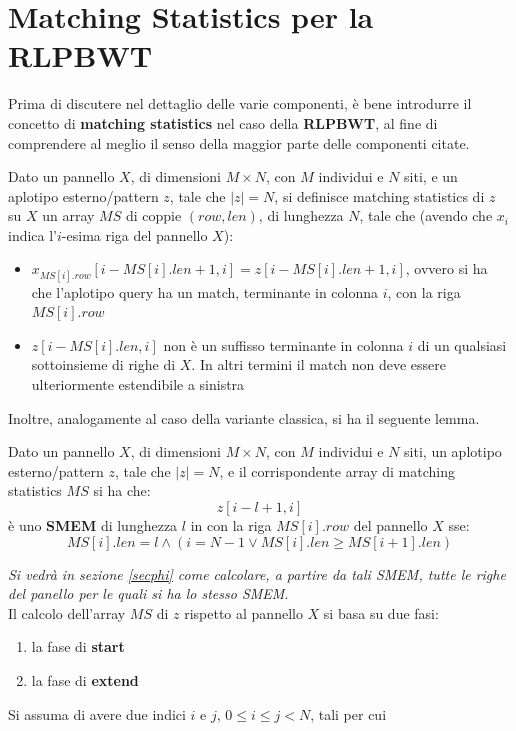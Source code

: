 \section{Matching Statistics per la RLPBWT}
Prima di discutere nel dettaglio delle varie componenti, è bene introdurre il
concetto di \textbf{matching statistics} nel caso della \textbf{RLPBWT}, al fine
di comprendere al meglio il senso della maggior parte delle componenti citate.
\begin{definizione}
  Dato un pannello $X$, di dimensioni $M\times N$, con $M$ individui e $N$ siti,
  e un aplotipo esterno/pattern $z$, tale che $|z|=N$, si definisce matching
  statistics di $z$ su $X$ un array $MS$ di coppie $(row,len)$, di lunghezza
  $N$, tale che (avendo che $x_i$ indica l'$i$-esima riga del pannello $X$): 
  \begin{itemize}
    \item $x_{MS[i].row}[i-MS[i].len+1,i]=z[i-MS[i].len+1,i]$, ovvero si ha che
    l'aplotipo query ha un match, terminante in colonna $i$, con la riga
    $MS[i].row$  
    \item $z[i-MS[i].len,i]$ non è un suffisso terminante in colonna $i$ di un
    qualsiasi sottoinsieme di righe di $X$. In altri termini il match non deve
    essere ulteriormente estendibile a sinistra
  \end{itemize}
\end{definizione}
Inoltre, analogamente al caso della variante classica, si ha il seguente lemma.
\begin{lemma}
  Dato un pannello $X$, di dimensioni $M\times N$, con $M$ individui e $N$
  siti, un aplotipo esterno/pattern $z$, tale che $|z|=N$, e il corrispondente
  array di matching statistics $MS$ si ha che:
  \[z[i-l+1,i]\]
  è uno \textbf{SMEM} di lunghezza $l$ in con la riga $MS[i].row$ del pannello
  $X$ sse: 
  \[MS[i].len=l\land(i=N-1\lor MS[i].len\geq MS[i+1].len)\]
\end{lemma}
\textit{Si vedrà in sezione \ref{secphi} come calcolare, a partire da tali
  \emph{SMEM}, tutte le righe del panello per le quali si ha lo stesso
  \emph{SMEM}}.\\
Il calcolo dell'array $MS$ di $z$ rispetto al pannello $X$ si basa su due fasi:
\begin{enumerate}
  \item la fase di \textbf{start}
  \item la fase di \textbf{extend}
\end{enumerate}
Si assuma di avere due indici $i$ e $j$, $0\leq i\leq j< N$, tali per cui

